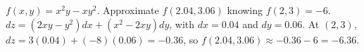 {$f(x,y) = x^2y-xy^2$. Approximate $f(2.04,3.06)$ knowing $f(2,3) = -6$. 
}
{$dz = (2xy-y^2)dx + (x^2-2xy)dy$, with $dx = 0.04$ and $dy = 0.06$. At $(2,3)$, $dz = 3(0.04) + (-8)(0.06) = -0.36$, so $f(2.04,3.06) \approx -0.36-6 = -6.36$.
}